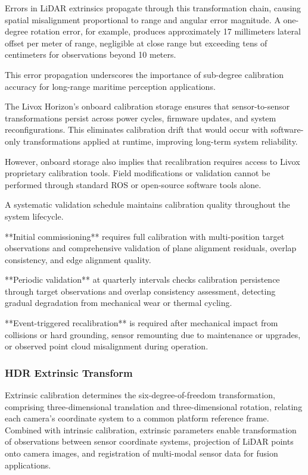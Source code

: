 Errors in LiDAR extrinsics propagate through this transformation chain, causing spatial misalignment proportional to range and angular error magnitude.
A one-degree rotation error, for example, produces approximately 17 millimeters lateral offset per meter of range, negligible at close range but exceeding tens of centimeters for observations beyond 10 meters.

This error propagation underscores the importance of sub-degree calibration accuracy for long-range maritime perception applications.


The Livox Horizon's onboard calibration storage ensures that sensor-to-sensor transformations persist across power cycles, firmware updates, and system reconfigurations.
This eliminates calibration drift that would occur with software-only transformations applied at runtime, improving long-term system reliability.

However, onboard storage also implies that recalibration requires access to Livox proprietary calibration tools.
Field modifications or validation cannot be performed through standard ROS or open-source software tools alone.


A systematic validation schedule maintains calibration quality throughout the system lifecycle.

**Initial commissioning** requires full calibration with multi-position target observations and comprehensive validation of plane alignment residuals, overlap consistency, and edge alignment quality.

**Periodic validation** at quarterly intervals checks calibration persistence through target observations and overlap consistency assessment, detecting gradual degradation from mechanical wear or thermal cycling.

**Event-triggered recalibration** is required after mechanical impact from collisions or hard grounding, sensor remounting due to maintenance or upgrades, or observed point cloud misalignment during operation.

\subsubsection{HDR Extrinsic Transform} \label{HDR_extrinsic}

Extrinsic calibration determines the six-degree-of-freedom transformation, comprising three-dimensional translation and three-dimensional rotation, relating each camera's coordinate system to a common platform reference frame.
Combined with intrinsic calibration, extrinsic parameters enable transformation of observations between sensor coordinate systems, projection of LiDAR points onto camera images, and registration of multi-modal sensor data for fusion applications.

